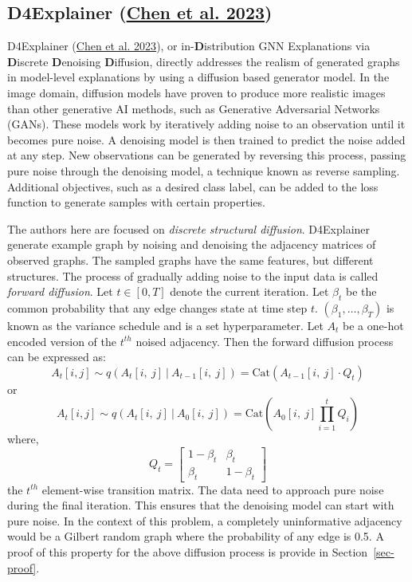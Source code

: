 \documentclass[
  11pt,
  letterpaper,
]{article}
\begin{document}
\hypertarget{d4explainer-chen_wu_gupta_ying_2023}{%
\subsection{\texorpdfstring{D4Explainer
(\protect\hyperlink{ref-Chen_Wu_Gupta_Ying_2023}{Chen et al.
2023})}{D4Explainer (Chen et al. 2023)}}\label{d4explainer-chen_wu_gupta_ying_2023}}

\quad D4Explainer (\protect\hyperlink{ref-Chen_Wu_Gupta_Ying_2023}{Chen
et al. 2023}), or in-\textbf{D}istribution GNN Explanations via
\textbf{D}iscrete \textbf{D}enoising \textbf{D}iffusion, directly
addresses the realism of generated graphs in model-level explanations by
using a diffusion based generator model. In the image domain, diffusion
models have proven to produce more realistic images than other
generative AI methods, such as Generative Adversarial Networks (GANs).
These models work by iteratively adding noise to an observation until it
becomes pure noise. A denoising model is then trained to predict the
noise added at any step. New observations can be generated by reversing
this process, passing pure noise through the denoising model, a
technique known as reverse sampling. Additional objectives, such as a
desired class label, can be added to the loss function to generate
samples with certain properties.

\quad The authors here are focused on \emph{discrete structural
diffusion}. D4Explainer generate example graph by noising and denoising
the adjacency matrices of observed graphs. The sampled graphs have the
same features, but different structures. The process of gradually adding
noise to the input data is called \emph{forward diffusion}. Let
\(t \in [0, T]\) denote the current iteration. Let \(\beta_t\) be the
common probability that any edge changes state at time step \(t\).
\((\beta_1, \dots, \beta_T)\) is known as the variance schedule and is a
set hyperparameter. Let \(A_t\) be a one-hot encoded version of the
\(t^{th}\) noised adjacency. Then the forward diffusion process can be
expressed as:\\
\begin{equation}
         A_t[i, j] \sim q(A_t[i, \ j] \ | \ A_{t-1}[i, \ j]) 
            = \text{Cat}(A_{t-1}[i, \ j] \cdot Q_t)
    \end{equation} or \begin{equation} \label{eq-forward-diff}
         A_t[i, j] \sim q(A_t[i, \ j] \ | \ A_{0}[i, \ j]) 
            = \text{Cat}\left(A_0[i, \ j] \prod_{i=1}^t  Q_i \right)
    \end{equation} where, \[
    Q_t = 
    \left[
    \begin{matrix}
        1-\beta_t & \beta_t \\ 
        \beta_t & 1 - \beta_t
    \end{matrix}
    \right]
    \] the \(t^{th}\) element-wise transition matrix. The data need to
approach pure noise during the final iteration. This ensures that the
denoising model can start with pure noise. In the context of this
problem, a completely uninformative adjacency would be a Gilbert random
graph where the probability of any edge is 0.5. A proof of this property
for the above diffusion process is provide in Section~\ref{sec-proof}.
\end{document}
